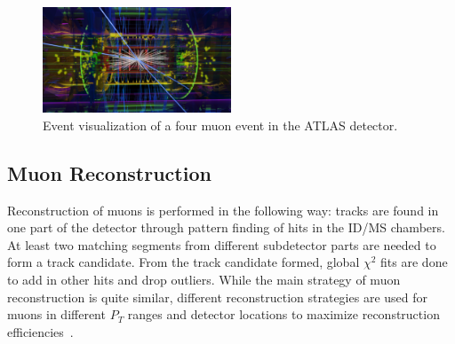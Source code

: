 \begin{figure}[!htb]
    \begin{center}
        \includegraphics[width=0.5\textwidth]{figures/common_ana/Muon}
        \caption{        
            Event visualization of a four muon event in the ATLAS detector\cite{ATLAS:1697053}.
        }
        \label{fig:muon}
    \end{center}
\end{figure}

\subsection{Muon Reconstruction}
Reconstruction of muons is performed in the following way: tracks are found in one part of the detector through pattern finding of hits in the ID/MS chambers. At least two matching segments from different subdetector parts are needed to form a track candidate. From the track candidate formed, global $\chi^{2}$ fits are done to add in other hits and drop outliers. While the main strategy of muon reconstruction is quite similar, different reconstruction strategies are used for muons in
different $P_{T}$ ranges and detector locations to maximize reconstruction efficiencies~\cite{muonReco2016}.

